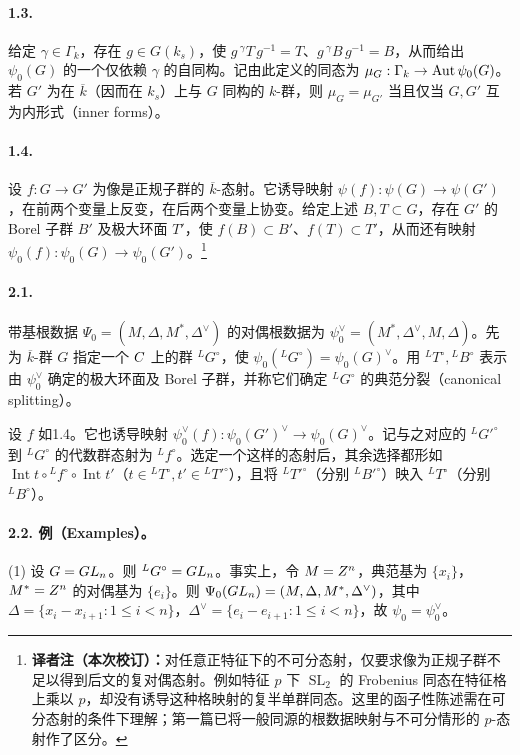 \paragraph*{1.3.} 给定 $\gamma\in\Gamma_k$，存在 $g\in G(k_s)$，使 $g\,{}^\gamma T\,g^{-1}=T$、$g\,{}^\gamma B\,g^{-1}=B$，从而给出 $\psi_0(G)$ 的一个仅依赖 $\gamma$ 的自同构。记由此定义的同态为 $\mu_G:\Gamma_k\to\operatorname{Aut}\psi_0(G)$。若 $G'$ 为在 $\overline k$（因而在 $k_s$）上与 $G$ 同构的 $k$-群，则 $\mu_G=\mu_{G'}$ 当且仅当 $G,G'$ 互为内形式（inner forms）。

\paragraph*{1.4.} 设 $f:G\to G'$ 为像是正规子群的 $\overline k$-态射。它诱导映射 $\psi(f):\psi(G)\to\psi(G')$，在前两个变量上反变，在后两个变量上协变。给定上述 $B,T\subset G$，存在 $G'$ 的 Borel 子群 $B'$ 及极大环面 $T'$，使 $f(B)\subset B'$、$f(T)\subset T'$，从而还有映射 $\psi_0(f):\psi_0(G)\to\psi_0(G')$。\footnote{\textbf{译者注（本次校订）：}对任意正特征下的不可分态射，仅要求像为正规子群不足以得到后文的复对偶态射。例如特征 $p$ 下 $\operatorname{SL}_2$ 的 Frobenius 同态在特征格上乘以 $p$，却没有诱导这种格映射的复半单群同态。这里的函子性陈述需在可分态射的条件下理解；第一篇已将一般同源的根数据映射与不可分情形的 $p$-态射作了区分。}

\paragraph*{2.1.} 带基根数据 $\Psi_0=(M,\Delta,M^*,\Delta^\vee)$ 的对偶根数据为 $\psi_0^\vee=(M^*,\Delta^\vee,M,\Delta)$。先为 $\overline k$-群 $G$ 指定一个 $C$ 上的群 ${}^LG^\circ$，使 $\psi_0({}^LG^\circ)=\psi_0(G)^\vee$。用 ${}^LT^\circ,{}^LB^\circ$ 表示由 $\psi_0^\vee$ 确定的极大环面及 Borel 子群，并称它们确定 ${}^LG^\circ$ 的典范分裂（canonical splitting）。

设 $f$ 如1.4。它也诱导映射 $\psi_0^\vee(f):\psi_0(G')^\vee\to\psi_0(G)^\vee$。记与之对应的 ${}^LG'^\circ$ 到 ${}^LG^\circ$ 的代数群态射为 ${}^Lf^\circ$。选定一个这样的态射后，其余选择都形如 $\operatorname{Int}t\circ{}^Lf^\circ\circ\operatorname{Int}t'$（$t\in{}^LT^\circ,t'\in{}^LT'^\circ$），且将 ${}^LT'^\circ$（分别 ${}^LB'^\circ$）映入 ${}^LT^\circ$（分别 ${}^LB^\circ$）。

\paragraph*{2.2. 例（Examples）。}
(1) 设 $G=GL_n$。则 ${}^LG^\circ=GL_n$。事实上，令 $M=Z^n$，典范基为 $\{x_i\}$，$M^*=Z^n$ 的对偶基为 $\{e_i\}$。则 $\Psi_0(GL_n)=(M,\Delta,M^*,\Delta^\vee)$，其中 $\Delta=\{x_i-x_{i+1}:1\leq i<n\}$，$\Delta^\vee=\{e_i-e_{i+1}:1\leq i<n\}$，故 $\psi_0=\psi_0^\vee$。

